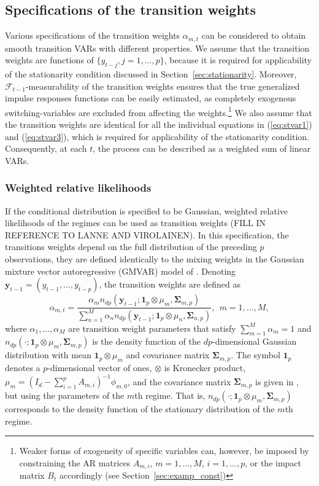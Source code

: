 \documentclass[nojss]{jss}
\begin{document}
\subsection{Specifications of the transition weights}
Various specifications of the transition weights $\alpha_{m,t}$ can be considered to obtain smooth transition VARs with different properties. We assume that the transition weights are functions of $\lbrace y_{t-j}, j=1,...,p \rbrace$, because it is required for applicability of the stationarity condition discussed in Section~\ref{sec:stationarity}. Moreover, $\mathcal{F}_{t-1}$-measurability of the transition weights ensures that the true generalized impulse responses functions can be easily estimated, as completely exogenous switching-variables are excluded from affecting the weights.\footnote{Weaker forms of exogeneity of specific variables can, however, be imposed by constraining the AR matrices $A_{m,i}$, $m=1,...,M$, $i=1,...,p$, or the impact matrix $B_t$ accordingly (see Section~\ref{sec:examp_const})} We also assume that the transition weights are identical for all the individual equations in (\ref{eq:stvar1}) and (\ref{eq:stvar3}), which is required for applicability of the stationarity condition. Consequently, at each $t$‚ the process can be described as a weighted sum of linear VARs.

\subsubsection{Weighted relative likelihoods}\label{sec:rel_dens}
If the conditional distribution is specified to be Gaussian, weighted relative likelihoods of the regimes can be used as transition weights (FILL IN REFERENCE TO LANNE AND VIROLAINEN). In this specification, the transitions weights depend on the full distribution of the preceding $p$ observations, they are defined identically to the mixing weights in the Gaussian mixture vector autoregressive (GMVAR) model of \cite{Kalliovirta+Meitz+Saikkonen:2016}.
Denoting $\boldsymbol{y}_{t-1}=(y_{t-1},...,y_{t-p})$, the transition weights are defined as
\begin{equation}\label{eq:alpha_mt}
\alpha_{m,t} = \frac{\alpha_m n_{dp}(\boldsymbol{y}_{t-1};\boldsymbol{1}_p\otimes \mu_m, \boldsymbol{\Sigma}_{m,p})}{\sum_{n=1}^M \alpha_n n_{dp}(\boldsymbol{y}_{t-1};\boldsymbol{1}_p\otimes \mu_n, \boldsymbol{\Sigma}_{n,p})}, \ \ m=1,...,M,
\end{equation}
where $\alpha_1,...,\alpha_M$ are transition weight parameters that satisfy $\sum_{m=1}^M \alpha_m=1$ and $n_{dp}(\cdot;\boldsymbol{1}_p\otimes \mu_m, \boldsymbol{\Sigma}_{m,p})$ is the density function of the $dp$-dimensional Gaussian distribution with mean $\boldsymbol{1}_p\otimes \mu_m$ and covariance matrix $\boldsymbol{\Sigma}_{m,p}$. The symbol $\boldsymbol{1}_p$ denotes a $p$-dimensional vector of ones, $\otimes$ is Kronecker product, $\mu_m=(I_d - \sum_{i=1}^pA_{m,i})^{-1}\phi_{m,0}$, and the covariance matrix $\boldsymbol{\Sigma}_{m,p}$ is given in \citet[Equation~(2.1.39)]{Lutkepohl:2005}, but using the parameters of the $m$th regime. That is, $n_{dp}(\cdot;\boldsymbol{1}_p\otimes \mu_m, \boldsymbol{\Sigma}_{m,p})$ corresponds to the density function of the stationary distribution of the $m$th regime.
\end{document}
